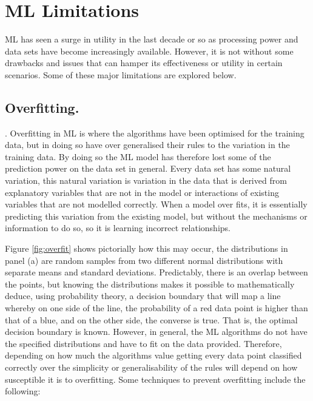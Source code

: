 \section{ML Limitations} ML has seen a surge in utility in the last decade or so as processing power and data sets have become increasingly available. However, it is not without some drawbacks and issues that can hamper its effectiveness or utility in certain scenarios. Some of these major limitations are explored below.




\subsection{Overfitting.} \parencite{chollet_allaire_2018}. Overfitting in ML is where the algorithms have been optimised for the training data, but in doing so have over generalised their rules to the variation in the training data. By doing so the ML model has therefore lost some of the prediction power on the data set in general. Every data set has some natural variation, this natural variation is variation in the data that is derived from explanatory variables that are not in the model or interactions of existing variables that are not modelled correctly. When a model over fits, it is essentially predicting this variation from the existing model, but without the mechanisms or information to do so, so it is learning incorrect relationships.  

Figure \ref{fig:overfit} shows pictorially how this may occur, the distributions in panel (a) are random samples from two different normal distributions with separate means and standard deviations. Predictably, there is an overlap between the points, but knowing the distributions makes it possible to mathematically deduce, using probability theory, a decision boundary that will map a line whereby on one side of the line, the probability of a red data point is higher than that of a blue, and on the other side, the converse is true. That is, the optimal decision boundary is known. However, in general, the ML algorithms do not have the specified distributions and have to fit on the data provided. Therefore, depending on how much the algorithms value getting every data point classified correctly over the simplicity or generalisability of the rules will depend on how susceptible it is to overfitting. Some techniques to prevent overfitting include the following:


